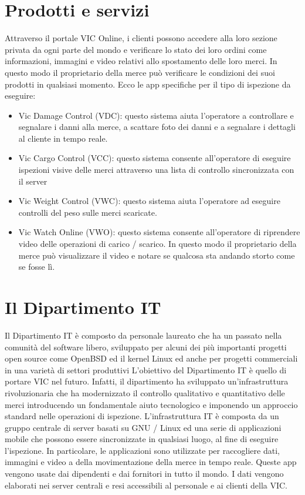 \section{Prodotti e servizi} %
	Attraverso il portale VIC Online, i clienti possono accedere alla loro sezione privata da ogni parte del mondo e 
	verificare lo stato dei loro ordini come informazioni, immagini e video relativi allo spostamento delle loro merci.
	In questo modo il proprietario della merce può verificare le condizioni dei suoi prodotti in qualsiasi momento.
	Ecco le app specifiche per il tipo di ispezione da eseguire:
	\begin{itemize}
		\item Vic Damage Control (VDC): questo sistema aiuta l'operatore a controllare e segnalare i danni alla merce, a scattare foto dei danni e a segnalare i dettagli al cliente in tempo reale.
		\item Vic Cargo Control (VCC): questo sistema consente all'operatore di eseguire ispezioni visive delle merci attraverso una lista di controllo sincronizzata con il server
		\item Vic Weight Control (VWC): questo sistema aiuta l'operatore ad eseguire controlli del peso sulle merci scaricate.
		\item Vic Watch Online (VWO): questo sistema consente all'operatore di riprendere video delle operazioni di carico / scarico. 
			In questo modo il proprietario della merce può visualizzare il video e notare se qualcosa sta andando storto come se fosse lì.
	\end{itemize}
	 

\section{Il Dipartimento IT} %
	Il Dipartimento IT è composto da personale laureato che ha un passato nella comunità del software libero, sviluppato per alcuni dei più 
	importanti progetti open source come OpenBSD ed il kernel Linux ed anche per progetti commerciali in una varietà di settori produttivi
	L'obiettivo del Dipartimento IT è quello di portare VIC nel futuro.
	Infatti, il dipartimento ha sviluppato un'infrastruttura rivoluzionaria che ha modernizzato il controllo qualitativo e quantitativo delle merci introducendo 
	un fondamentale aiuto tecnologico e imponendo un approccio standard nelle operazioni di ispezione.
	L'infrastruttura IT è composta da un gruppo centrale di server basati su GNU / Linux ed una serie di applicazioni mobile che possono essere sincronizzate in 
	qualsiasi luogo, al fine di eseguire l'ispezione. In particolare, le applicazioni sono utilizzate per raccogliere dati, 
	immagini e video a della movimentazione della merce in tempo reale.
	Queste app vengono usate dai dipendenti e dai fornitori in tutto il mondo. I dati vengono elaborati nei server centrali e resi accessibili al personale e ai clienti della VIC.
	


